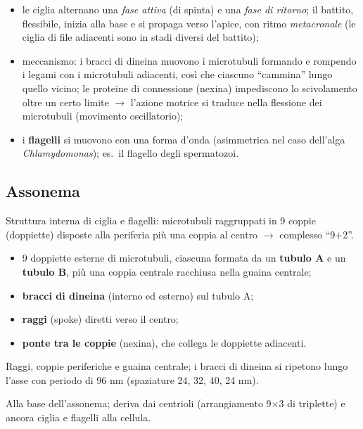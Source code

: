 \begin{itemize}
  \item le ciglia alternano una \textit{fase attiva} (di spinta) e una \textit{fase di ritorno}; il battito, flessibile, inizia alla base e si propaga verso l'apice, con ritmo \textit{metacronale} (le ciglia di file adiacenti sono in stadi diversi del battito);
  \item meccanismo: i bracci di dineina muovono i microtubuli formando e rompendo i legami con i microtubuli adiacenti, così che ciascuno ``cammina'' lungo quello vicino; le proteine di connessione (nexina) impediscono lo scivolamento oltre un certo limite $\rightarrow$ l'azione motrice si traduce nella flessione dei microtubuli (movimento oscillatorio);
  \item i \textbf{flagelli} si muovono con una forma d'onda (asimmetrica nel caso dell'alga \textit{Chlamydomonas}); es.\ il flagello degli spermatozoi.
\end{itemize}

\subsection{Assonema}

Struttura interna di ciglia e flagelli: microtubuli raggruppati in 9 coppie (doppiette) disposte alla periferia più una coppia al centro $\rightarrow$ complesso ``9$+$2''.

\begin{itemize}
  \item 9 doppiette esterne di microtubuli, ciascuna formata da un \textbf{tubulo A} e un \textbf{tubulo B}, più una coppia centrale racchiusa nella guaina centrale;
  \item \textbf{bracci di dineina} (interno ed esterno) sul tubulo A;
  \item \textbf{raggi} (spoke) diretti verso il centro;
  \item \textbf{ponte tra le coppie} (nexina), che collega le doppiette adiacenti.
\end{itemize}

Raggi, coppie periferiche e guaina centrale; i bracci di dineina si ripetono lungo l'asse con periodo di 96 nm (spaziature 24, 32, 40, 24 nm).

Alla base dell'assonema; deriva dai centrioli (arrangiamento 9$\times$3 di triplette) e ancora ciglia e flagelli alla cellula.
